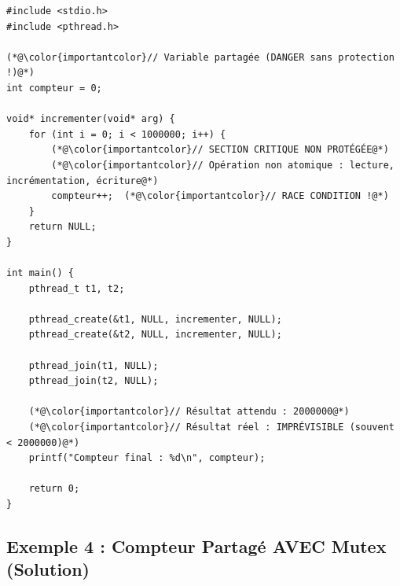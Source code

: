 \documentclass[11pt,a4paper]{article}
\begin{document}
\begin{lstlisting}[caption={Problème de race condition}]
#include <stdio.h>
#include <pthread.h>

(*@\color{importantcolor}// Variable partagée (DANGER sans protection !)@*)
int compteur = 0;

void* incrementer(void* arg) {
    for (int i = 0; i < 1000000; i++) {
        (*@\color{importantcolor}// SECTION CRITIQUE NON PROTÉGÉE@*)
        (*@\color{importantcolor}// Opération non atomique : lecture, incrémentation, écriture@*)
        compteur++;  (*@\color{importantcolor}// RACE CONDITION !@*)
    }
    return NULL;
}

int main() {
    pthread_t t1, t2;
    
    pthread_create(&t1, NULL, incrementer, NULL);
    pthread_create(&t2, NULL, incrementer, NULL);
    
    pthread_join(t1, NULL);
    pthread_join(t2, NULL);
    
    (*@\color{importantcolor}// Résultat attendu : 2000000@*)
    (*@\color{importantcolor}// Résultat réel : IMPRÉVISIBLE (souvent < 2000000)@*)
    printf("Compteur final : %d\n", compteur);
    
    return 0;
}
\end{lstlisting}

\subsection{Exemple 4 : Compteur Partagé AVEC Mutex (Solution)}
\end{document}

